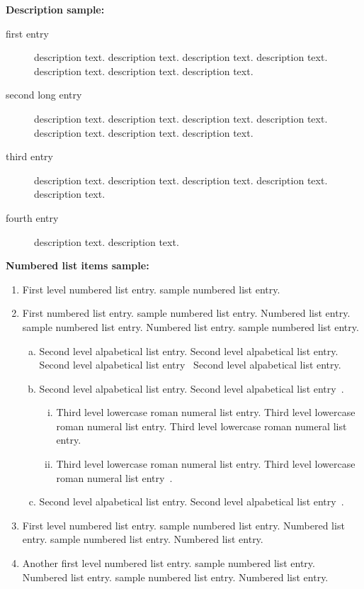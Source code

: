 \documentclass[AMS,STIX2COL]{WileyNJD-v2}
\begin{document}
    \noindent\textbf{Description sample:}

    \begin{description}
        \item[first entry] description text. description text. description text. description text. description text. description text. description text.
        \item[second long entry] description text. description text. description text. description text. description text. description text. description text.
        \item[third entry] description text. description text. description text. description text. description text.
        \item[fourth entry] description text. description text.
    \end{description}


    \noindent\textbf{Numbered list items sample:}

    \begin{enumerate}[1.]
        \item First level numbered list entry. sample numbered list entry.

        \item First numbered list entry. sample numbered list entry. Numbered list entry. sample numbered list entry. Numbered list entry. sample numbered list entry.

        \begin{enumerate}[a.]
            \item Second level alpabetical list entry. Second level alpabetical list entry. Second level alpabetical list entry~\citet{Allen2011} Second level alpabetical list entry.

            \item Second level alpabetical list entry. Second level alpabetical list entry~\citet{Schulz2012,Allen2011,Ballen2011}.

            \begin{enumerate}[ii.]
                \item Third level lowercase roman numeral list entry. Third level lowercase roman numeral list entry. Third level lowercase roman numeral list entry.

                \item Third level lowercase roman numeral list entry. Third level lowercase roman numeral list entry~\cite{Yoo2007}.
            \end{enumerate}

            \item Second level alpabetical list entry. Second level alpabetical list entry~\cite{Elbaum2002}.
        \end{enumerate}

        \item First level numbered list entry. sample numbered list entry. Numbered list entry. sample numbered list entry. Numbered list entry.

        \item Another first level numbered list entry. sample numbered list entry. Numbered list entry. sample numbered list entry. Numbered list entry.
    \end{enumerate}
\end{document}
